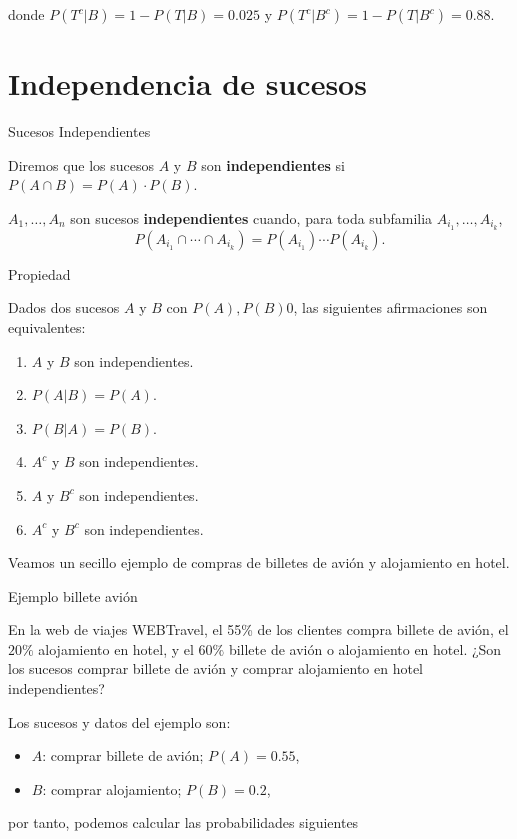 \documentclass[
  letterpaper,
  DIV=11,
  numbers=noendperiod]{scrreprt}
\providecommand{\tightlist}{%
  \setlength{\itemsep}{0pt}\setlength{\parskip}{0pt}}\usepackage{longtable,booktabs,array}
\begin{document}
donde \(P(T^c|B)=1-P(T|B)=0.025\) y \(P(T^c|B^c)=1-P(T|B^c)=0.88.\)

\chapter{Independencia de sucesos}\label{independencia-de-sucesos}

Sucesos Independientes

Diremos que los sucesos \(A\) y \(B\) son \textbf{independientes} si
\(P(A\cap B)=P(A)\cdot P(B)\).

\(A_1,\ldots, A_n\) son sucesos \textbf{independientes} cuando, para
toda subfamilia \(A_{i_1},\ldots,A_{i_k}\), \[
P(A_{i_1}\cap \cdots\cap A_{i_k})=P(A_{i_1})\cdots P(A_{i_k}).
\]

Propiedad

Dados dos sucesos \(A\) y \(B\) con \(P(A),P(B)0\), las siguientes
afirmaciones son equivalentes:

\begin{enumerate}
\def\labelenumi{\arabic{enumi}.}
\tightlist
\item
  \(A\) y \(B\) son independientes.
\item
  \(P(A|B)=P(A)\).
\item
  \(P(B|A)=P(B)\).
\item
  \(A^c\) y \(B\) son independientes.
\item
  \(A\) y \(B^c\) son independientes.
\item
  \(A^c\) y \(B^c\) son independientes.
\end{enumerate}

Veamos un secillo ejemplo de compras de billetes de avión y alojamiento
en hotel.

Ejemplo billete avión

En la web de viajes WEBTravel, el 55\% de los clientes compra billete de
avión, el \(20\%\) alojamiento en hotel, y el \(60\%\) billete de avión
o alojamiento en hotel. ¿Son los sucesos comprar billete de avión y
comprar alojamiento en hotel independientes?

Los sucesos y datos del ejemplo son:

\begin{itemize}
\tightlist
\item
  \(A\): comprar billete de avión; \(P(A)=0.55\),
\item
  \(B\): comprar alojamiento; \(P(B)=0.2\),
\end{itemize}

por tanto, podemos calcular las probabilidades siguientes
\end{document}
